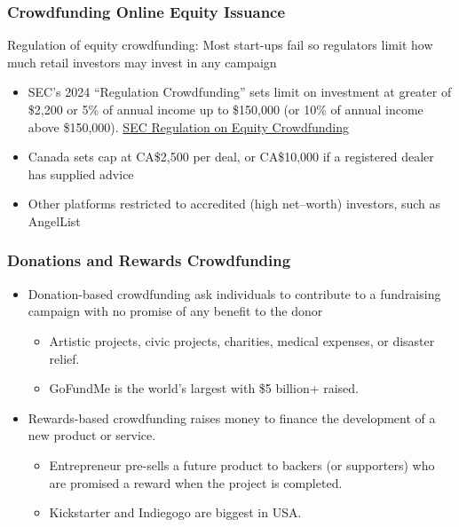 \documentclass[aspectratio=169,xcolor=dvipsnames]{beamer}
\begin{document}
\begin{frame}
\frametitle{Crowdfunding Online Equity Issuance}


Regulation of equity crowdfunding: Most start-ups fail so regulators limit how much retail investors may invest in any campaign
\begin{itemize}
    \item SEC's 2024 ``Regulation Crowdfunding'' sets limit on investment at greater of \$2,200 or 5\% of annual income up to \$150,000 (or 10\% of annual income above \$150,000). \href{https://www.sec.gov/education/smallbusiness/exemptofferings/regcrowdfunding}{SEC Regulation on Equity Crowdfunding}
    \item Canada sets cap at CA\$2,500 per deal, or CA\$10,000 if a registered dealer has supplied advice
    \item Other platforms restricted to accredited (high net–worth) investors, such as AngelList
\end{itemize}


\end{frame} 













\begin{frame}
\frametitle{Donations and Rewards Crowdfunding}


\begin{itemize}
    \item Donation-based crowdfunding ask individuals to contribute to a fundraising campaign with no promise of any benefit to the donor
    \begin{itemize}
        \item Artistic projects, civic projects, charities, medical expenses, or disaster relief.
        \smallskip 
        \item GoFundMe is the world's largest with \$5 billion+ raised.
    \end{itemize}
    \medskip 
    \item Rewards-based crowdfunding raises money to finance the development of a new product or service. 
    \begin{itemize}
        \item Entrepreneur pre-sells a future product to backers (or supporters) who are promised a reward when the project is completed.
        \smallskip
        \item Kickstarter and Indiegogo are biggest in USA.
    \end{itemize}
\end{itemize}



\end{frame} 
\end{document}

